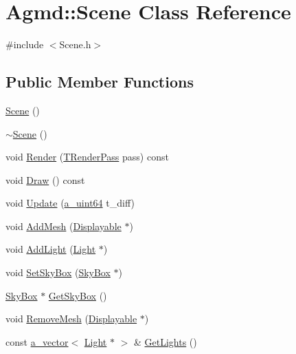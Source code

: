 \hypertarget{class_agmd_1_1_scene}{\section{Agmd\+:\+:Scene Class Reference}
\label{class_agmd_1_1_scene}
}


{\ttfamily \#include $<$Scene.\+h$>$}

\subsection*{Public Member Functions}
\begin{DoxyCompactItemize}
\item 
\hyperlink{class_agmd_1_1_scene_a6b19eed0049231e84f9560c9ff19bdb8}{Scene} ()
\item 
\hyperlink{class_agmd_1_1_scene_ae29ea12d1350cf2f753c304debdcff32}{$\sim$\+Scene} ()
\item 
void \hyperlink{class_agmd_1_1_scene_a093246111cca2a83ae0c5415609605a5}{Render} (\hyperlink{namespace_agmd_a893087981df53d0bf39466e9039aeb73}{T\+Render\+Pass} pass) const 
\item 
void \hyperlink{class_agmd_1_1_scene_a0d5e4509302ae5d7227c0186cb9d7ed4}{Draw} () const 
\item 
void \hyperlink{class_agmd_1_1_scene_a20e89763e8f1181f10c45bce87a5ec60}{Update} (\hyperlink{_common_defines_8h_a6c5192ec3c55d6e5b13d2dbaa082bdea}{a\+\_\+uint64} t\+\_\+diff)
\item 
void \hyperlink{class_agmd_1_1_scene_a3548b8bf093a815a30cd44710fdc4219}{Add\+Mesh} (\hyperlink{class_agmd_1_1_displayable}{Displayable} $\ast$)
\item 
void \hyperlink{class_agmd_1_1_scene_a37ec859a37fc24cdeb33b82b817c60fc}{Add\+Light} (\hyperlink{class_agmd_1_1_light}{Light} $\ast$)
\item 
void \hyperlink{class_agmd_1_1_scene_ab35002aa6ddf9cc555ea39b1e0e700ef}{Set\+Sky\+Box} (\hyperlink{class_agmd_1_1_sky_box}{Sky\+Box} $\ast$)
\item 
\hyperlink{class_agmd_1_1_sky_box}{Sky\+Box} $\ast$ \hyperlink{class_agmd_1_1_scene_aa0bee806744f4d322d1cb7a2f460716b}{Get\+Sky\+Box} ()
\item 
void \hyperlink{class_agmd_1_1_scene_abd11c1b8f2d16ca563a881cf1b0be0ae}{Remove\+Mesh} (\hyperlink{class_agmd_1_1_displayable}{Displayable} $\ast$)
\item 
const \hyperlink{_vector_8h_a3df82cea60ff4ad0acb44e58454406a5}{a\+\_\+vector}$<$ \hyperlink{class_agmd_1_1_light}{Light} $\ast$ $>$ \& \hyperlink{class_agmd_1_1_scene_a7b5bc39608f2b4700ade55709ec07bbb}{Get\+Lights} ()
\end{DoxyCompactItemize}


